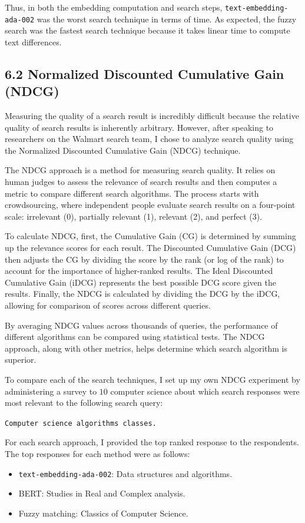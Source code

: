 \documentclass[
	a4paper, %
	10pt, %
	unnumberedsections, %
	twoside, %
]{LTJournalArticle}
\begin{document}
Thus, in both the embedding computation and search steps, \texttt{text-embedding-ada-002} was the worst search technique in terms of time. As expected, the fuzzy search was the fastest search technique because it takes linear time to compute text differences. 

\subsection{6.2 Normalized Discounted Cumulative Gain (NDCG)}

Measuring the quality of a search result is incredibly difficult because the relative quality of search results is inherently arbitrary. However, after speaking to researchers on the Walmart search team, I chose to analyze search quality using the Normalized Discounted Cumulative Gain (NDCG) technique. 

The NDCG approach is a method for measuring search quality. It relies on human judges to assess the relevance of search results and then computes a metric to compare different search algorithms. The process starts with crowdsourcing, where independent people evaluate search results on a four-point scale: irrelevant (0), partially relevant (1), relevant (2), and perfect (3).

To calculate NDCG, first, the Cumulative Gain (CG) is determined by summing up the relevance scores for each result. The Discounted Cumulative Gain (DCG) then adjusts the CG by dividing the score by the rank (or log of the rank) to account for the importance of higher-ranked results. The Ideal Discounted Cumulative Gain (iDCG) represents the best possible DCG score given the results. Finally, the NDCG is calculated by dividing the DCG by the iDCG, allowing for comparison of scores across different queries.

By averaging NDCG values across thousands of queries, the performance of different algorithms can be compared using statistical tests. The NDCG approach, along with other metrics, helps determine which search algorithm is superior.

To compare each of the search techniques, I set up my own NDCG experiment 
by administering a survey to $10$ computer science about which search responses were most relevant to the following search query: 
\begin{center}
	\texttt{Computer science algorithms classes.}
\end{center}

For each search approach, I provided the top ranked response to the respondents. The top responses for each method were as follows: 
\begin{itemize}
	\item \texttt{text-embedding-ada-002}: Data structures and algorithms.
	\item BERT: Studies in Real and Complex analysis. 
	\item Fuzzy matching: Classics of Computer Science.
\end{itemize}
\end{document}
